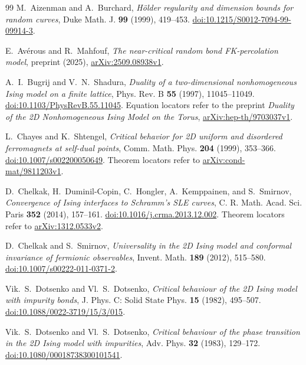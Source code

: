 \begingroup
\raggedright
\begin{thebibliography}{99}
M.~Aizenman and A.~Burchard,
\emph{H\"older regularity and dimension bounds for random curves},
Duke Math. J. \textbf{99} (1999), 419--453.
\href{https://doi.org/10.1215/S0012-7094-99-09914-3}{doi:10.1215/S0012-7094-99-09914-3}.

E.~Av\'erous and R.~Mahfouf,
\emph{The near-critical random bond FK-percolation model},
preprint (2025), \href{https://arxiv.org/abs/2509.08938v1}{arXiv:2509.08938v1}.

A.~I.~Bugrij and V.~N.~Shadura,
\emph{Duality of a two-dimensional nonhomogeneous Ising model on a finite lattice},
Phys. Rev. B \textbf{55} (1997), 11045--11049.
\href{https://doi.org/10.1103/PhysRevB.55.11045}{doi:10.1103/PhysRevB.55.11045}.
Equation locators refer to the preprint
\emph{Duality of the 2D Nonhomogeneous Ising Model on the Torus},
\href{https://arxiv.org/abs/hep-th/9703037v1}{arXiv:hep-th/9703037v1}.

L.~Chayes and K.~Shtengel,
\emph{Critical behavior for 2D uniform and disordered ferromagnets at self-dual points},
Comm. Math. Phys. \textbf{204} (1999), 353--366.
\href{https://doi.org/10.1007/s002200050649}{doi:10.1007/s002200050649}.
Theorem locators refer to \href{https://arxiv.org/abs/cond-mat/9811203v1}{arXiv:cond-mat/9811203v1}.

D.~Chelkak, H.~Duminil-Copin, C.~Hongler, A.~Kemppainen, and S.~Smirnov,
\emph{Convergence of Ising interfaces to Schramm's SLE curves},
C. R. Math. Acad. Sci. Paris \textbf{352} (2014), 157--161.
\href{https://doi.org/10.1016/j.crma.2013.12.002}{doi:10.1016/j.crma.2013.12.002}.
Theorem locators refer to \href{https://arxiv.org/abs/1312.0533v2}{arXiv:1312.0533v2}.

D.~Chelkak and S.~Smirnov,
\emph{Universality in the 2D Ising model and conformal invariance of fermionic observables},
Invent. Math. \textbf{189} (2012), 515--580.
\href{https://doi.org/10.1007/s00222-011-0371-2}{doi:10.1007/s00222-011-0371-2}.

Vik.~S.~Dotsenko and Vl.~S.~Dotsenko,
\emph{Critical behaviour of the 2D Ising model with impurity bonds},
J. Phys. C: Solid State Phys. \textbf{15} (1982), 495--507.
\href{https://doi.org/10.1088/0022-3719/15/3/015}{doi:10.1088/0022-3719/15/3/015}.

Vik.~S.~Dotsenko and Vl.~S.~Dotsenko,
\emph{Critical behaviour of the phase transition in the 2D Ising model with impurities},
Adv. Phys. \textbf{32} (1983), 129--172.
\href{https://doi.org/10.1080/00018738300101541}{doi:10.1080/00018738300101541}.


\end{thebibliography}
